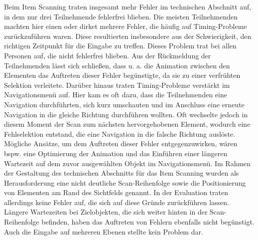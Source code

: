 Beim Item Scanning traten insgesamt mehr Fehler im technischen Abschnitt auf, in dem nur drei Teilnehmende fehlerfrei blieben. Die meisten Teilnehmenden machten hier einen oder dirket mehrere Fehler, die häufig auf Timing-Probleme zurückzuführen waren. Diese resultierten insbesondere aus der Schwierigkeit, den richtigen Zeitpunkt für die Eingabe zu treffen. Dieses Problem trat bei allen Personen auf, die nicht fehlerfrei blieben. Aus der Rückmeldung der Teilnehmenden lässt sich schließen, dass u. a. die Animation zwischen den Elementen das Auftreten dieser Fehler begünstigte, da sie zu einer verfrühten Selektion verleitete. Darüber hinaus traten Timing-Probleme verstärkt im Navigationsmenü auf.  Hier kam es oft dazu, dass die Teilnehmenden eine Navigation durchführten, sich kurz umschauten und im Anschluss eine erneute Navigation in die gleiche Richtung durchführen wollten. Oft wechselte jedoch in diesem Moment der Scan zum nächsten hervorgehobenen Element, wodurch eine Fehlselektion entstand, die eine Navigation in die falsche Richtung auslöste. Mögliche Ansätze, um dem Auftreten dieser Fehler entgegenzuwirken, wären bspw. eine Optimierung der Animation und das Einführen einer längeren Wartezeit auf dem zuvor ausgewählten Objekt im Navigationsmenü. 
Im Rahmen der Gestaltung des technischen Abschnitts für das Item Scanning wurden als Herausforderung eine nicht deutliche Scan-Reihenfolge sowie die Positionierung von Elementen am Rand des Sichtfelds genannt. In der Evaluation traten allerdings keine Fehler auf, die sich auf diese Gründe zurückführen lassen. Längere Wartezeiten bei Zielobjekten, die sich weiter hinten in der Scan-Reihenfolge befinden, haben das Auftreten von Fehlern ebenfalls nicht begünstigt. Auch die Eingabe auf mehreren Ebenen stellte kein Problem dar. 

